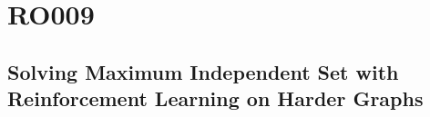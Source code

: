 \documentclass[12pt]{article}
\begin{document}
\centering
\section*{RO009}
\vspace{5ex}
\subsection*{Solving Maximum Independent Set with Reinforcement Learning on Harder Graphs}
\end{document}
